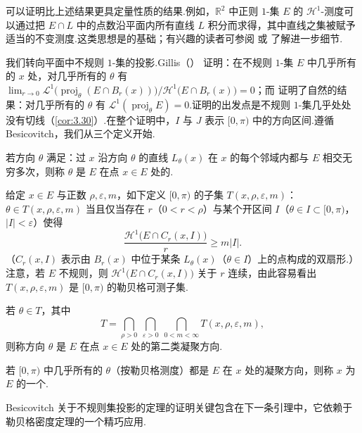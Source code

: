 可以证明比上述结果更具定量性质的结果.例如，$\mathbb{R}^2$ 中正则 $1$-集 $E$ 的 $\mathcal{H}^1$-测度可以通过把 $E\cap L$ 中的点数沿平面内所有直线 $L$ 积分而求得，其中直线之集被赋予适当的不变测度.这类思想是的基础；有兴趣的读者可参阅 \textcite{santalo1976} 或 \textcite{federer1969} 了解进一步细节.

我们转向平面中不规则 $1$-集的投影.Gillis（\citeyear{gillis1934a,gillis1936a}） 证明：在不规则 $1$-集 $E$ 中几乎所有的 $x$ 处，对几乎所有的 $\theta$ 有 $\lim_{r\to 0}\mathscr{L}^1\bigl(\operatorname{proj}_{\theta}(E\cap B_r(x))\bigr)/\mathcal{H}^1\bigl(E\cap B_r(x)\bigr)=0$；而 \textcite{besicovitch1939} 证明了自然的结果：对几乎所有的 $\theta$ 有 $\mathscr{L}^1(\operatorname{proj}_{\theta}E)=0$.证明的出发点是不规则 $1$-集几乎处处没有切线（\cref{cor:3.30}）.在整个证明中，$I$ 与 $J$ 表示 $[0,\pi)$ 中的方向区间.遵循 Besicovitch，我们从三个定义开始.

若方向 $\theta$ 满足：过 $x$ 沿方向 $\theta$ 的直线 $L_{\theta}(x)$ 在 $x$ 的每个邻域内都与 $E$ 相交无穷多次，则称 $\theta$ 是 $E$ 在点 $x\in E$ 处的.

给定 $x\in E$ 与正数 $\rho,\varepsilon,m$，如下定义 $[0,\pi)$ 的子集 $T(x,\rho,\varepsilon,m)$：$\theta\in T(x,\rho,\varepsilon,m)$ 当且仅当存在 $r$（$0<r<\rho$）与某个开区间 $I$（$\theta\in I\subset[0,\pi)$，$|I|<\varepsilon$）使得
\begin{equation}\label{eq:6.9}
  \frac{\mathcal{H}^{1}\bigl(E\cap C_r(x,I)\bigr)}{r}\geq m|I|.
\end{equation}
（$C_r(x,I)$ 表示由 $B_r(x)$ 中位于某条 $L_\theta(x)$（$\theta\in I$）上的点构成的双扇形.）注意，若 $E$ 不规则，则 $\mathcal{H}^1\bigl(E\cap C_r(x,I)\bigr)$ 关于 $r$ 连续，由此容易看出 $T(x,\rho,\varepsilon,m)$ 是 $[0,\pi)$ 的勒贝格可测子集.

若 $\theta\in T$，其中
\begin{equation}\label{eq:6.10}
  T=\bigcap_{\rho>0}\ \bigcap_{\varepsilon>0}\ \bigcap_{0<m<\infty}T(x,\rho,\varepsilon,m),
\end{equation}
则称方向 $\theta$ 是 $E$ 在点 $x\in E$ 处的第二类凝聚方向.

若 $[0,\pi)$ 中几乎所有的 $\theta$（按勒贝格测度）都是 $E$ 在 $x$ 处的凝聚方向，则称 $x$ 为 $E$ 的一个.

Besicovitch 关于不规则集投影的定理的证明关键包含在下一条引理中，它依赖于勒贝格密度定理的一个精巧应用.


